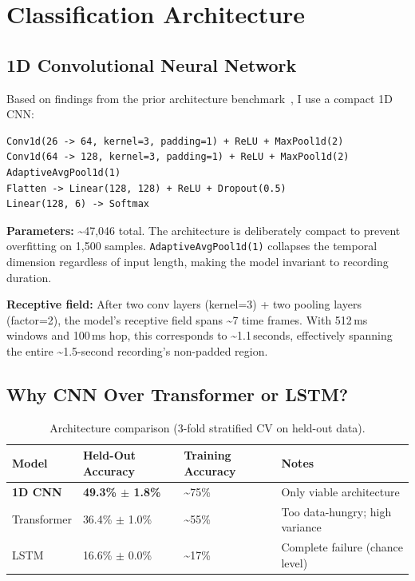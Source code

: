 \documentclass{article}
\begin{document}
\section{Classification Architecture}
\label{sec:architecture}

\subsection{1D Convolutional Neural Network}

Based on findings from the prior architecture benchmark~\cite{kho2026prior}, I use a compact 1D CNN:

\begin{verbatim}
Conv1d(26 -> 64, kernel=3, padding=1) + ReLU + MaxPool1d(2)
Conv1d(64 -> 128, kernel=3, padding=1) + ReLU + MaxPool1d(2)
AdaptiveAvgPool1d(1)
Flatten -> Linear(128, 128) + ReLU + Dropout(0.5)
Linear(128, 6) -> Softmax
\end{verbatim}

\textbf{Parameters:} \textasciitilde47{,}046 total. The architecture is deliberately compact to prevent overfitting on 1{,}500 samples. \texttt{AdaptiveAvgPool1d(1)} collapses the temporal dimension regardless of input length, making the model invariant to recording duration.

\textbf{Receptive field:} After two conv layers (kernel=3) + two pooling layers (factor=2), the model's receptive field spans \textasciitilde7 time frames. With 512\,ms windows and 100\,ms hop, this corresponds to \textasciitilde1.1\,seconds, effectively spanning the entire \textasciitilde1.5-second recording's non-padded region.

\subsection{Why CNN Over Transformer or LSTM?}

\begin{table}[h]
\centering
\caption{Architecture comparison (3-fold stratified CV on held-out data).}
\label{tab:arch_comparison}
\begin{tabular}{@{}llll@{}}
\toprule
Model & Held-Out Accuracy & Training Accuracy & Notes \\
\midrule
\textbf{1D CNN} & \textbf{49.3\% $\pm$ 1.8\%} & \textasciitilde75\% & Only viable architecture \\
Transformer & 36.4\% $\pm$ 1.0\% & \textasciitilde55\% & Too data-hungry; high variance \\
LSTM & 16.6\% $\pm$ 0.0\% & \textasciitilde17\% & Complete failure (chance level) \\
\bottomrule
\end{tabular}
\end{table}
\end{document}
